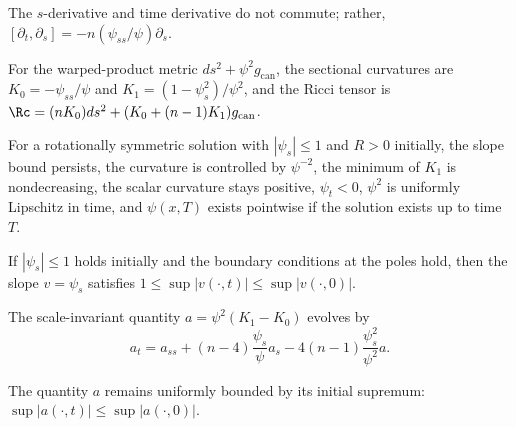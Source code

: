 \begin{remark}
\label{ch02-rem-neckpinch-pde}

The \(s\)-derivative and time derivative do not commute; rather,
\([\partial_t,\partial_s]=-n(\psi_{ss}/\psi)\partial_s\).
\end{remark}

\begin{remark}
\label{ch02-rem-neckpinch-curvatures}

For the warped-product metric \(ds^2+\psi^2g_{\mathrm{can}}\), the sectional
curvatures are \(K_0=-\psi_{ss}/\psi\) and \(K_1=(1-\psi_s^2)/\psi^2\), and
the Ricci tensor is \(\Rc=(nK_0)ds^2+(K_0+(n-1)K_1)g_{\mathrm{can}}\).
\end{remark}

\begin{proposition}
\label{ch02-prop-neckpinch-bounds}

For a rotationally symmetric solution with \(|\psi_s|\le 1\) and \(R>0\)
initially, the slope bound persists, the curvature is controlled by
\(\psi^{-2}\), the minimum of \(K_1\) is nondecreasing, the scalar curvature
stays positive, \(\psi_t<0\), \(\psi^2\) is uniformly Lipschitz in time, and
\(\psi(x,T)\) exists pointwise if the solution exists up to time \(T\).
\end{proposition}

\begin{lemma}
\label{ch02-lem-neckpinch-slope}

If \(|\psi_s|\le 1\) holds initially and the boundary conditions at the poles
hold, then the slope \(v=\psi_s\) satisfies \(1\le \sup|v(\cdot,t)|\le \sup|v(\cdot,0)|\).
\end{lemma}

\begin{lemma}
\label{ch02-lem-neckpinch-a-evolution}

The scale-invariant quantity \(a=\psi^2(K_1-K_0)\) evolves by
\[
a_t=a_{ss}+(n-4)\frac{\psi_s}{\psi}a_s-4(n-1)\frac{\psi_s^2}{\psi^2}a.
\]
\end{lemma}

\begin{corollary}
\label{ch02-cor-neckpinch-a-bound}

The quantity \(a\) remains uniformly bounded by its initial supremum:
\(\sup|a(\cdot,t)|\le \sup|a(\cdot,0)|\).
\end{corollary}


